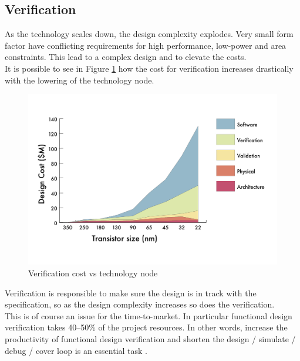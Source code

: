 \subsection{Verification}
As the technology scales down, the design complexity explodes. 
Very small form factor have conflicting requirements for high performance, low-power and area constraints. 
This lead to a complex design and to elevate the costs.\\

It is possible to see in Figure \ref{verification-tecnology} how the cost for verification increases drastically with the lowering of the technology node.


\begin{figure}[H]
    \centering
    \includegraphics[scale = 0.4]{Chapter_1/img/cost-scale.png}
    \caption{Verification cost vs technology node \cite{verification-book-2018}}
    \label{verification-tecnology}
\end{figure}

Verification is responsible to make sure the design is in track with the specification, so as the design complexity increases so does the verification.\\

This is of course an issue for the time-to-market. 
In particular functional design verification takes 40–50\% of the project resources. In other words, increase the productivity of functional design verification and shorten the design / simulate / debug / cover loop is an essential task \cite{verification-book-2018}.\\

